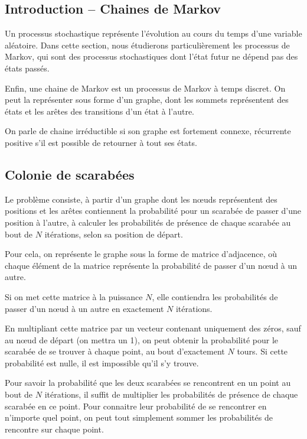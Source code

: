 \subsection{Introduction -- Chaines de Markov}
  Un processus stochastique représente l'évolution au cours du temps d'une
  variable aléatoire. Dans cette section, nous étudierons particulièrement les
  processus de Markov, qui sont des processus stochastiques dont l'état futur
  ne dépend pas des états passés.

  Enfin, une chaine de Markov est un processus de Markov à temps discret. On
  peut la représenter sous forme d'un graphe, dont les sommets représentent des
  états et les arêtes des transitions d'un état à l'autre.

  On parle de chaine irréductible si son graphe est fortement connexe,
  récurrente positive s'il est possible de retourner à tout ses états.

\subsection{Colonie de scarabées}
  Le problème consiste, à partir d'un graphe dont les nœuds représentent des
  positions et les arêtes contiennent la probabilité pour un scarabée de passer
  d'une position à l'autre, à calculer les probabilités de présence de chaque
  scarabée au bout de $N$ itérations, selon sa position de départ.

  Pour cela, on représente le graphe sous la forme de matrice d'adjacence, où
  chaque élément de la matrice représente la probabilité de passer d'un nœud à
  un autre.

  Si on met cette matrice à la puissance $N$, elle contiendra les probabilités
  de passer d'un nœud à un autre en exactement $N$ itérations.

  En multipliant cette matrice par un vecteur contenant uniquement des zéros,
  sauf au nœud de départ (on mettra un 1), on peut obtenir la probabilité pour
  le scarabée de se trouver à chaque point, au bout d'exactement $N$ tours.  Si
  cette probabilité est nulle, il est impossible qu'il s'y trouve.

  Pour savoir la probabilité que les deux scarabées se rencontrent en un point
  au bout de $N$ itérations, il suffit de multiplier les probabilités de
  présence de chaque scarabée en ce point. Pour connaitre leur probabilité de se
  rencontrer en n'importe quel point, on peut tout simplement sommer les
  probabilités de rencontre sur chaque point.

